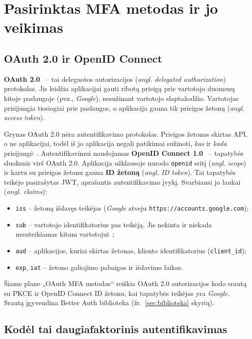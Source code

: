 \section{Pasirinktas MFA metodas ir jo veikimas}
\label{sec:metodas}

\subsection{OAuth 2.0 ir OpenID Connect}
\label{subsec:oauth_oidc}

\textbf{OAuth 2.0}~\cite{rfc6749} -- tai deleguotos autorizacijos (\textit{angl. delegated authorization}) protokolas. Jis leidžia aplikacijai gauti ribotą prieigą prie vartotojo duomenų kitoje paslaugoje (pvz., \textit{Google}), nesužinant vartotojo slaptažodžio. Vartotojas prisijungia tiesiogiai prie paslaugos, o aplikacija gauna tik prieigos žetoną (\textit{angl. access token}).

Grynas OAuth 2.0 nėra autentifikavimo protokolas. Prieigos žetonas skirtas API, o ne aplikacijai, todėl iš jo aplikacija negali patikimai sužinoti, \emph{kas} ir \emph{kada} prisijungė~\cite{oauth_authentication}. Autentifikavimui naudojamas \textbf{OpenID Connect 1.0}~\cite{oidc_core} -- tapatybės sluoksnis virš OAuth 2.0. Aplikacija užklausoje nurodo \texttt{openid} sritį (\textit{angl. scope}) ir kartu su prieigos žetonu gauna \textbf{ID žetoną} (\textit{angl. ID token}). Tai tapatybės teikėjo pasirašytas JWT, aprašantis autentifikavimo įvykį. Svarbiausi jo laukai (\textit{angl. claims}):
\begin{itemize}
    \item \texttt{iss} -- žetoną išdavęs teikėjas (\textit{Google} atveju \texttt{https://accounts.google.com});
    \item \texttt{sub} -- vartotojo identifikatorius pas teikėją. Jis nekinta ir niekada nesuteikiamas kitam vartotojui~\cite{google_oidc};
    \item \texttt{aud} -- aplikacijos, kuriai skirtas žetonas, kliento identifikatorius (\texttt{client\_id});
    \item \texttt{exp}, \texttt{iat} -- žetono galiojimo pabaigos ir išdavimo laikas.
\end{itemize}

Šiame plane „OAuth MFA metodas“ reiškia OAuth 2.0 autorizacijos kodo srautą su PKCE ir OpenID Connect ID žetonu, kai tapatybės teikėjas yra \textit{Google}. Srautą įgyvendina Better Auth biblioteka (žr.~\ref{sec:biblioteka} skyrių).

\subsection{Kodėl tai daugiafaktorinis autentifikavimas}
\label{subsec:faktorius}

